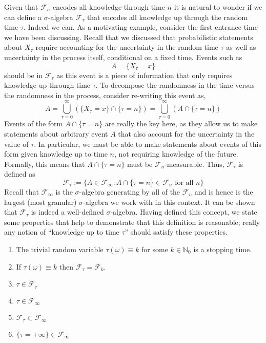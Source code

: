 \documentclass[12pt]{article}
\begin{document}
Given that $\mathcal{F}_n$ encodes all knowledge through time $n$ it is natural to wonder if we can define a $\sigma$-algebra $\mathcal{F}_\tau$ that encodes all knowledge up through the 
random time $\tau$. Indeed we can. As a motivating example, consider the first entrance time we have been discussing. Recall that we discussed that probabilistic statements about $X_\tau$ 
require accounting for the uncertainty in the random time $\tau$ as well as uncertainty in the process itself, conditional on a fixed time. Events such as 
\[A = \{X_\tau = x\}\]
should be in $\mathcal{F}_\tau$ as this event is a piece of information that only requires knowledge up through time $\tau$. To decompose the randomness in the time versus the randomness 
in the process, consider re-writing this event as, 
\[A = \bigcup_{\tau = 0}^{\infty} \left(\{X_\tau = x\} \cap \{\tau = n\}\right) = \bigcup_{\tau = 0}^{\infty} \left(A \cap \{\tau = n\}\right) \]
Events of the form $A \cap \{\tau = n\}$ are really the key here, as they allow us to make statements about arbitrary event $A$ that also account for the uncertainty in the value of 
$\tau$. In particular, we must be able to make statements about events of this form given knowledge up to time $n$, not requiring knowledge of the future. Formally, this means that 
$A \cap \{\tau = n\}$ must be $\mathcal{F}_n$-measurable. Thus, $\mathcal{F}_\tau$ is defined as 
\[\mathcal{F}_\tau := \{A \in \mathcal{F}_\infty : A \cap \{\tau = n\} \in \mathcal{F}_n \text{ for all } n\}\]
Recall that $\mathcal{F}_\infty$ is the $\sigma$-algebra generating by all of the $\mathcal{F}_n$ and is hence is the largest (most granular) $\sigma$-algebra we work with in this context. 
It can be shown that $\mathcal{F}_\tau$ is indeed a well-defined $\sigma$-algebra. Having defined this concept, we state some properties that help to demonstrate that this definition is 
reasonable; really any notion of ``knowledge up to time $\tau$'' should satisfy these properties. 
\begin{enumerate}
\item The trivial random variable $\tau(\omega) \equiv k$ for some $k \in \mathbb{N}_0$ is a stopping time. 
\item If $\tau(\omega) \equiv k$ then $\mathcal{F}_\tau = \mathcal{F}_k$. 
\item $\tau \in \mathcal{F}_\tau$
\item $\tau \in \mathcal{F}_\infty$
\item $\mathcal{F}_\tau \subset \mathcal{F}_\infty$
\item $\{\tau = +\infty\} \in \mathcal{F}_\infty$
\end{enumerate}
\end{document}
